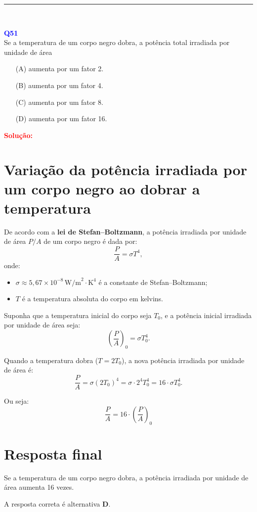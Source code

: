 \documentclass[a4paper,12pt]{article}
\begin{document}
\noindent\rule{\linewidth}{0.6pt}\\

\begin{flushleft}
\textbf{\textcolor{blue}{\Large Q51}}\\
\noindent
Se a temperatura de um corpo negro dobra, a potência total
irradiada por unidade de área

\begin{itemize}
\item[(A)] aumenta por um fator 2.
\item[(B)] aumenta por um fator 4.
\item[(C)] aumenta por um fator 8.
\item[(D)] aumenta por um fator 16.
\end{itemize}

\vspace{0.5cm}

\textcolor{red}{\textbf{Solução:}}\\
\section*{Variação da potência irradiada por um corpo negro ao dobrar a temperatura}

De acordo com a \textbf{lei de Stefan--Boltzmann}, a potência irradiada por unidade de área \( P/A \) de um corpo negro é dada por:
\[
\frac{P}{A} = \sigma T^4,
\]
onde:
\begin{itemize}
    \item \( \sigma \approx 5,67 \times 10^{-8} \, \text{W/m}^2\cdot\text{K}^4 \) é a constante de Stefan--Boltzmann;
    \item \( T \) é a temperatura absoluta do corpo em kelvins.
\end{itemize}

Suponha que a temperatura inicial do corpo seja \( T_0 \), e a potência inicial irradiada por unidade de área seja:
\[
\left( \frac{P}{A} \right)_0 = \sigma T_0^4.
\]

Quando a temperatura dobra (\( T = 2T_0 \)), a nova potência irradiada por unidade de área é:
\[
\frac{P}{A} = \sigma (2T_0)^4 = \sigma \cdot 2^4 T_0^4 = 16 \cdot \sigma T_0^4.
\]

Ou seja:
\[
\frac{P}{A} = 16 \cdot \left( \frac{P}{A} \right)_0
\]

\section*{Resposta final}

Se a temperatura de um corpo negro dobra, a potência irradiada por unidade de área aumenta 16 vezes.

A resposta correta é alternativa \colorbox{green!50}{\textbf{D}}.
\end{flushleft}
\end{document}
